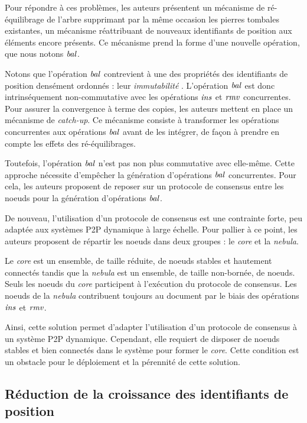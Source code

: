 Pour répondre à ces problèmes, les auteurs présentent un mécanisme de ré-équilibrage de l'arbre supprimant par la même occasion les pierres tombales existantes, \ie un mécanisme réattribuant de nouveaux identifiants de position aux éléments encore présents.
Ce mécanisme prend la forme d'une nouvelle opération, que nous notons $\mathit{bal}$.

Notons que l'opération $\mathit{bal}$ contrevient à une des propriétés des identifiants de position densément ordonnés : leur \emph{immutabilité} .
L'opération $\mathit{bal}$ est donc intrinséquement non-commutative avec les opérations $\mathit{ins}$ et $\mathit{rmv}$ concurrentes.
Pour assurer la convergence à terme des copies, les auteurs mettent en place un mécanisme de \emph{catch-up}.
Ce mécanisme consiste à transformer les opérations concurrentes aux opérations $\mathit{bal}$ avant de les intégrer, de façon à prendre en compte les effets des ré-équilibrages.

Toutefois, l'opération $\mathit{bal}$ n'est pas non plus commutative avec elle-même.
Cette approche nécessite d'empêcher la génération d'opérations $\mathit{bal}$ concurrentes.
Pour cela, les auteurs proposent de reposer sur un protocole de consensus entre les noeuds pour la génération d'opérations $\mathit{bal}$.

De nouveau, l'utilisation d'un protocole de consensus est une contrainte forte, peu adaptée aux systèmes \ac{P2P} dynamique à large échelle.
Pour pallier à ce point, les auteurs proposent de répartir les noeuds dans deux groupes : le \emph{core} et la \emph{nebula}.

Le \emph{core} est un ensemble, de taille réduite, de noeuds stables et hautement connectés tandis que la \emph{nebula} est un ensemble, de taille non-bornée, de noeuds.
Seuls les noeuds du \emph{core} participent à l'exécution du protocole de consensus.
Les noeuds de la \emph{nebula} contribuent toujours au document par le biais des opérations $\mathit{ins}$ et $\mathit{rmv}$.

Ainsi, cette solution permet d'adapter l'utilisation d'un protocole de consensus à un système \ac{P2P} dynamique.
Cependant, elle requiert de disposer de noeuds stables et bien connectés dans le système pour former le \emph{core}.
Cette condition est un obstacle pour le déploiement et la pérennité de cette solution.

\subsection{Réduction de la croissance des identifiants de position}

